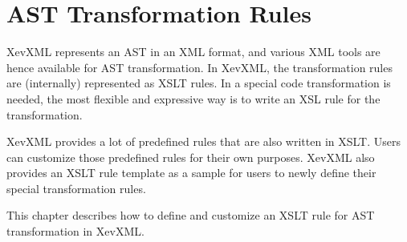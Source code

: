 \chapter{AST Transformation Rules}

XevXML represents an AST in an XML format, and various XML tools are
hence available for AST transformation. In XevXML, the transformation
rules are (internally) represented as XSLT rules. In a special code
transformation is needed, the most flexible and expressive way is to
write an XSL rule for the transformation.

XevXML provides a lot of predefined rules that are also written in XSLT.
Users can customize those predefined rules for their own
purposes. XevXML also provides an XSLT rule template as a sample for
users to newly define their special transformation rules.

This chapter describes how to define and customize an XSLT rule for AST
transformation in XevXML.

